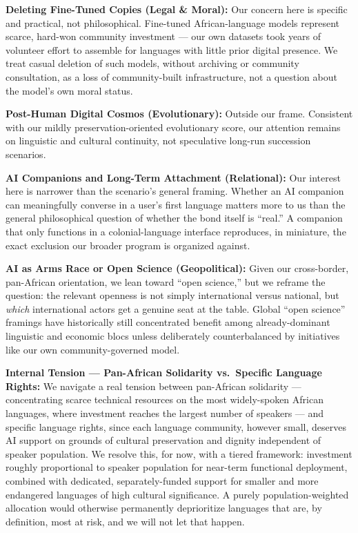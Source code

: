 \textbf{Deleting Fine-Tuned Copies (Legal \& Moral):} Our concern here
is specific and practical, not philosophical. Fine-tuned
African-language models represent scarce, hard-won community investment
--- our own datasets took years of volunteer effort to assemble for
languages with little prior digital presence. We treat casual deletion
of such models, without archiving or community consultation, as a loss
of community-built infrastructure, not a question about the model's own
moral status.

\textbf{Post-Human Digital Cosmos (Evolutionary):} Outside our frame.
Consistent with our mildly preservation-oriented evolutionary score, our
attention remains on linguistic and cultural continuity, not speculative
long-run succession scenarios.

\textbf{AI Companions and Long-Term Attachment (Relational):} Our
interest here is narrower than the scenario's general framing. Whether
an AI companion can meaningfully converse in a user's first language
matters more to us than the general philosophical question of whether
the bond itself is ``real.'' A companion that only functions in a
colonial-language interface reproduces, in miniature, the exact
exclusion our broader program is organized against.

\textbf{AI as Arms Race or Open Science (Geopolitical):} Given our
cross-border, pan-African orientation, we lean toward ``open science,''
but we reframe the question: the relevant openness is not simply
international versus national, but \emph{which} international actors get
a genuine seat at the table. Global ``open science'' framings have
historically still concentrated benefit among already-dominant
linguistic and economic blocs unless deliberately counterbalanced by
initiatives like our own community-governed model.

\textbf{Internal Tension --- Pan-African Solidarity vs.~Specific
Language Rights:} We navigate a real tension between pan-African
solidarity --- concentrating scarce technical resources on the most
widely-spoken African languages, where investment reaches the largest
number of speakers --- and specific language rights, since each language
community, however small, deserves AI support on grounds of cultural
preservation and dignity independent of speaker population. We resolve
this, for now, with a tiered framework: investment roughly proportional
to speaker population for near-term functional deployment, combined with
dedicated, separately-funded support for smaller and more endangered
languages of high cultural significance. A purely population-weighted
allocation would otherwise permanently deprioritize languages that are,
by definition, most at risk, and we will not let that happen.


